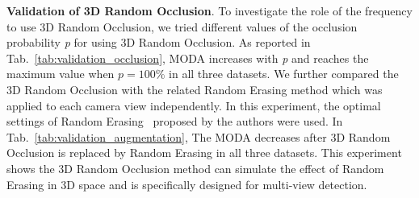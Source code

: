 \documentclass[runningheads]{llncs}
\begin{document}
	
	\begin{table}[b]
		\begin{center}
			\caption{Validation of the occlusion probability (with 5-layer projection applied).}
			\label{tab:validation_occlusion}
		\end{center}
	\end{table}
	
	\textbf{Validation of 3D Random Occlusion}. To investigate the role of the frequency to use 3D Random Occlusion, we tried different values of the occlusion probability \textit{p} for using 3D Random Occlusion. As reported in Tab.~\ref{tab:validation_occlusion}, MODA increases with \textit{p} and reaches the maximum value when $p = 100\%$ in all three datasets. We further compared the 3D Random Occlusion with the related Random Erasing method which was applied to each camera view independently. In this experiment, the optimal settings of Random Erasing~\cite{zhong2020random} proposed by the authors were used. In Tab.~\ref{tab:validation_augmentation}, The MODA decreases after 3D Random Occlusion is replaced by Random Erasing in all three datasets. This experiment shows the 3D Random Occlusion method can simulate the effect of Random Erasing in 3D space and is specifically designed for multi-view detection.
	
\end{document}
